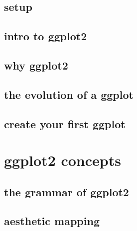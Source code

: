 \documentclass[
]{book}
\begin{document}
\hypertarget{setup}{%
\subsection*{setup}\label{setup}}

\hypertarget{intro-to-ggplot2}{%
\subsection*{intro to ggplot2}\label{intro-to-ggplot2}}

\hypertarget{why-ggplot2}{%
\subsection*{why ggplot2}\label{why-ggplot2}}

\hypertarget{the-evolution-of-a-ggplot}{%
\subsection*{the evolution of a ggplot}\label{the-evolution-of-a-ggplot}}

\hypertarget{create-your-first-ggplot}{%
\subsection*{create your first ggplot}\label{create-your-first-ggplot}}

\hypertarget{ggplot2-concepts-1}{%
\section{ggplot2 concepts}\label{ggplot2-concepts-1}}

\hypertarget{the-grammar-of-ggplot2}{%
\subsection*{the grammar of ggplot2}\label{the-grammar-of-ggplot2}}

\hypertarget{aesthetic-mapping}{%
\subsection*{aesthetic mapping}\label{aesthetic-mapping}}
\end{document}
